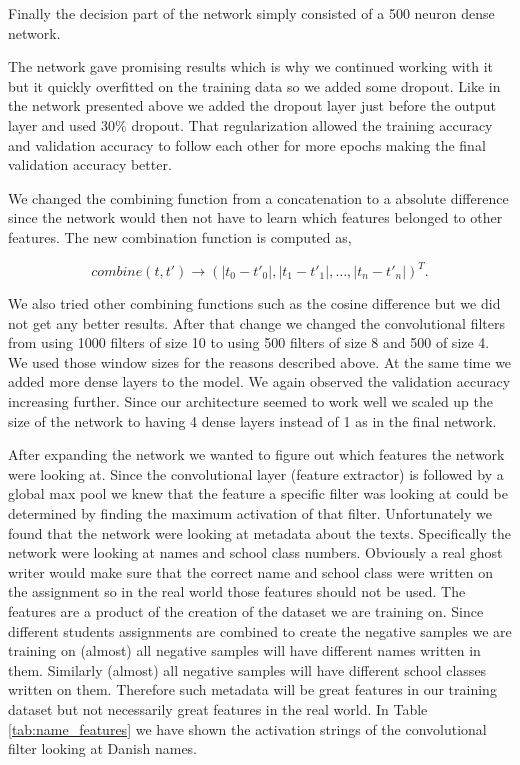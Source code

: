 Finally the decision part of the network simply consisted of a 500 neuron dense
network.

The network gave promising results which is why we continued working with it but
it quickly overfitted on the training data so we added some dropout. Like in
the network presented above we added the dropout layer just before the output
layer and used 30\% dropout. That regularization allowed the training accuracy
and validation accuracy to follow each other for more epochs making the final
validation accuracy better.

We changed the combining function from a concatenation to a absolute difference
since the network would then not have to learn which features belonged to other
features. The new combination function is computed as,

\begin{equation}\label{eq:abs}
    combine(t, t') \rightarrow \left(
        |t_0 - t'_0|, |t_1 - t'_1|, \dots, |t_n - t'_n|
    \right)^T.
\end{equation}

We also tried other combining functions such as the cosine difference but we
did not get any better results. After that change we changed the convolutional
filters from using 1000 filters of size 10 to using 500 filters of size 8 and
500 of size 4. We used those window sizes for the reasons described above. At
the same time we added more dense layers to the model. We again observed the
validation accuracy increasing further. Since our architecture seemed to work
well we scaled up the size of the network to having 4 dense layers instead of
1 as in the final network.

After expanding the network we wanted to figure out which features the network
were looking at. Since the convolutional layer (feature extractor) is followed
by a global max pool we knew that the feature a specific filter was looking at
could be determined by finding the maximum activation of that filter.
Unfortunately we found that the network were looking at metadata about the
texts. Specifically the network were looking at names and school class numbers.
Obviously a real ghost writer would make sure that the correct name and school
class were written on the assignment so in the real world those features should
not be used. The features are a product of the creation of the dataset we are
training on. Since different students assignments are combined to create the
negative samples we are training on (almost) all negative samples will have
different names written in them. Similarly (almost) all negative samples will
have different school classes written on them. Therefore such metadata will be
great features in our training dataset but not necessarily great features in the
real world. In Table \ref{tab:name_features} we have shown the activation
strings of the convolutional filter looking at Danish names.

